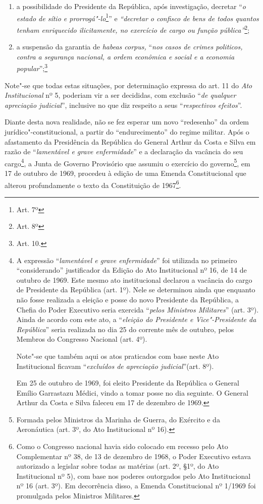 \begin{enumerate}
\item{}a possibilidade do Presidente da República, após investigação,
decretar ``\emph{o estado de sítio e prorrogá"-lo}\footnote{Art. 7º}'' e
\emph{``decretar o confisco de bens de todos quantos tenham enriquecido
ilicitamente, no exercício de cargo ou função pública''}\footnote{Art.
  8º};

\item{}a suspensão da garantia de \emph{habeas corpus,} ``\emph{nos casos de
crimes politicos, contra a segurança nacional, a ordem econômica e
social e a economia popular}'';\footnote{Art. 10.}
\end{enumerate}

Note"-se que todas estas situações, por determinação expressa do art. 11
do \emph{Ato Institucional} nº 5, poderiam vir a ser decididas, com
exclusão ``\emph{de qualquer apreciação judicial}'', inclusive no que
diz respeito a seus ``\emph{respectivos efeitos}''.

Diante desta nova realidade, não se fez esperar um novo ``redesenho'' da
ordem jurídico"-constitucional, a partir do ``endurecimento'' do regime
militar. Após o afastamento da Presidência da República do General
Arthur da Costa e Silva em razão de ``\emph{lamentável e grave
enfermidade}'' e a declaração da vacância do seu cargo\footnote{A
  expressão ``\emph{lamentável e grave enfermidade}'' foi utilizada no
  primeiro ``considerando'' justificador da Edição do Ato Institucional
  nº 16, de 14 de outubro de 1969. Este mesmo ato institucional declarou
  a vacância do cargo de Presidente da República (art. 1º). Nele se
  determinou ainda que enquanto não fosse realizada a eleição e posse do
  novo Presidente da República, a Chefia do Poder Executivo seria
  exercida ``\emph{pelos Ministros Militares}'' (art. 3º). Ainda de
  acordo com este ato, a ``\emph{eleição do Presidente e Vice"-Presidente
  da República}'' seria realizada no dia 25 do corrente mês de outubro,
  pelos Membros do Congresso Nacional (art. 4º).

  Note"-se que também aqui os atos praticados com base neste Ato
  Institucional ficavam ``\emph{excluídos de apreciação judicial}''(art.
  8º).

  Em 25 de outubro de 1969, foi eleito Presidente da República o General
  Emílio Garrastazu Médici, vindo a tomar posse no dia seguinte. O
  General Arthur da Costa e Silva faleceu em 17 de dezembro de 1969.}, a
Junta de Governo Provisório que assumiu o exercício do governo\footnote{Formada
  pelos Ministros da Marinha de Guerra, do Exército e da Aeronáutica
  (art. 3º, do Ato Institucional nº 16).}, em 17 de outubro de 1969,
procedeu à edição de uma Emenda Constitucional que alterou profundamente
o texto da Constituição de 1967\footnote{Como o Congresso nacional havia
  sido colocado em recesso pelo Ato Complementar nº 38, de 13 de
  dezembro de 1968, o Poder Executivo estava autorizado a legislar sobre
  todas as matérias (art. 2º, §1º, do Ato Institucional nº 5), com base
  nos poderes outorgados pelo Ato Institucional nº 16 (art. 3º). Em
  decorrência disso, a Emenda Constitucional nº 1/1969 foi promulgada
  pelos Ministros Militares.}.

